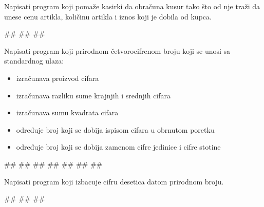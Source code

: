 \begin{Exercise}[label=p1_06] 
Napisati program koji pomaže kasirki da obračuna kusur tako što od nje traži da unese cenu artikla, količinu artikla i iznos koji je dobila od kupca. \\
\begin{miditest}
\begin{upotreba}{1}
#\naslovInt#
##
##
\end{upotreba}
\end{miditest}
\end{Exercise}
\begin{Answer}[ref=p1_06]
\end{Answer}


\begin{Exercise}[label=p1_07] 
Napisati program koji prirodnom četvorocifrenom broju koji se unosi sa standardnog ulaza:
\begin{itemize}
\item izračunava proizvod cifara
\item izračunava razliku sume krajnjih i srednjih cifara 
\item izračunava sumu kvadrata cifara
\item određuje broj koji se dobija ispisom cifara u obrnutom poretku
\item određuje broj koji se dobija zamenom cifre jedinice i cifre stotine
\end{itemize}

\begin{maxitest}
\begin{upotreba}{1}
#\naslovInt#
##
##
##
##
##
##
\end{upotreba}
\end{maxitest}
\end{Exercise}
\begin{Answer}[ref=p1_07]
\end{Answer}


\begin{Exercise}[label=p1_08] 
Napisati program koji izbacuje cifru desetica datom prirodnom broju. \\
\begin{miditest}
\begin{upotreba}{1}
#\naslovInt#
##
##
\end{upotreba}
\end{miditest}
\end{Exercise}
\begin{Answer}[ref=p1_08]
\end{Answer}


